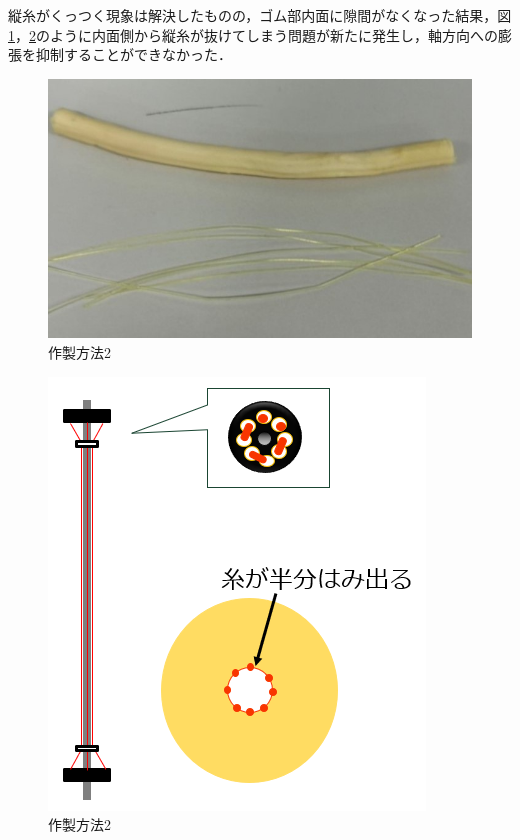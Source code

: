 縦糸がくっつく現象は解決したものの，ゴム部内面に隙間がなくなった結果，図\ref{fig:22}，\ref{fig:23}のように内面側から縦糸が抜けてしまう問題が新たに発生し，軸方向への膨張を抑制することができなかった．
\begin{figure}[ht]
  \centering  %
  \includegraphics[scale=0.3]{pic/20.jpg}
  \caption{作製方法2}
  \label{fig:22}
\end{figure}
\begin{figure}[ht]
  \centering  %
  \includegraphics[scale=0.5]{pic/21.PNG}
  \caption{作製方法2}
  \label{fig:23}
\end{figure}
\newpage
